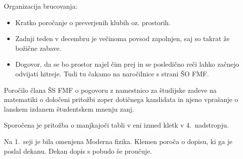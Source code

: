 \documentclass{seja}
\begin{document}
\begin{ad}
  Organizacija brucovanja:
  \begin{itemize}
      \item Kratko poročanje o preverjenih klubih oz. prostorih.
      \item Zadnji teden v decembru je večinoma povsod zapolnjen, saj so takrat že božične zabave.
      \item Dogovor, da se bo prostor najel čim prej in se posledično reči lahko začnejo odvijati hitreje. Tudi tu čakamo na naročilnice s strani ŠO FMF.
  \end{itemize}
  
\item
  Poročilo člana ŠS FMF o pogovoru z namestnico za študijske zadeve na matematiki o določeni pritožbi zoper dotičnega kandidata in njeno vprašanje o lanskem izdanem študentskem mnenju zanj.
  
  Sporočena je pritožba o manjkajoči tabli v eni izmed kletk v 4.~nadstropju.
  
  Na 1.~seji je bila omenjena Moderna fizika. Klemen poroča o dopisu, ki ga je poslal dekanu. Dekan dopis s pobudo še proučuje.
  
\end{ad}

\makeatletter \global\let\@enddocumenthook\@empty \makeatother
{}
\end{document}
